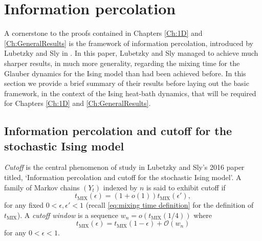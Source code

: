 \section{Information percolation}
\label{sec:information percolation}
	A cornerstone to the proofs contained in Chapters \ref{Ch:1D} and \ref{Ch:GeneralResults} is the framework of information percolation, introduced by Lubetzky and Sly in \cite{Lubetzky2016-wd}. In this paper, Lubetzky and Sly managed to achieve much sharper results, in much more generality, regarding the mixing time for the Glauber dynamics for the Ising model than had been achieved before. In this section we provide a brief summary of their results before laying out the basic framework, in the context of the Ising heat-bath dynamics, that will be required for Chapters \ref{Ch:1D} and \ref{Ch:GeneralResults}.

	\subsection{Information percolation and cutoff for the stochastic Ising model}
	\emph{Cutoff} is the central phenomenon of study in Lubetzky and Sly's 2016 paper titled, `Information percolation and cutoff for the stochastic Ising model'.
	A family of Markov chains $(Y_t)$ indexed by $n$ is said to exhibit cutoff if
	\begin{equation}
		t_\mathrm{MIX}(\epsilon) = (1 + o(1)) t_\mathrm{MIX}(\epsilon'),
	\end{equation}
	for any fixed $0 < \epsilon, \epsilon' < 1$ (recall \eqref{eq:mixing time definition} for the definition of $t_\mathrm{MIX}$). A \emph{cutoff window} is a sequence $w_n = o(t_\mathrm{MIX}(1/4))$ where
	\begin{equation}
		t_\mathrm{MIX}(\epsilon) = t_\mathrm{MIX}(1 - \epsilon) + \mathcal{O}(w_n)
	\end{equation}
	for any $0 < \epsilon <1$.

